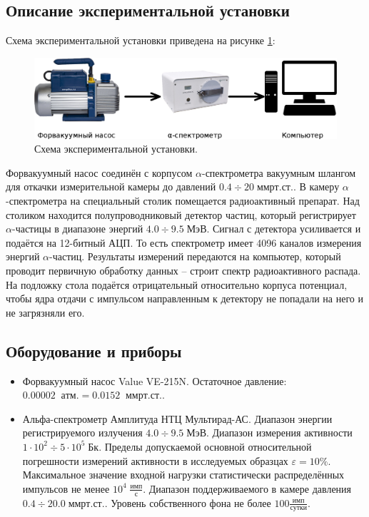 \documentclass[a4paper, 12pt]{article}
\newcommand{\atm}[1][\;]{#1 атм.}
\newcommand{\mmhg}[1][\;]{#1 мм рт.ст.}
\newcommand{\Bk}[1][\;]{#1 Бк}
\newcommand{\MeV}[1][\;]{#1 МэВ}
\begin{document}
    \subsection{Описание экспериментальной установки}	
    
    Схема экспериментальной установки приведена на рисунке \ref{img:exp_scheme}:
        
    \begin{figure}[H]
        \centering
        \includegraphics[width=1\textwidth]{images/exp_scheme.png}
        \caption{Схема экспериментальной установки.}
        \label{img:exp_scheme}
    \end{figure}

    Форвакуумный насос соединён с корпусом $\alpha$-спектрометра вакуумным шлангом для откачки измерительной камеры до давлений $0.4 \div 20 \mmhg$. В камеру $\alpha$-спектрометра на специальный столик помещается радиоактивный препарат. Над столиком находится полупроводниковый детектор частиц, который регистрирует $\alpha$-частицы в диапазоне энергий $4.0 \div 9.5 \MeV$. Сигнал с детектора усиливается и подаётся на 12-битный АЦП. То есть спектрометр имеет 4096 каналов измерения энергий $\alpha$-частиц. Результаты измерений передаются на компьютер, который проводит первичную обработку данных -- строит спектр радиоактивного распада. На подложку стола подаётся отрицательный относительно корпуса потенциал, чтобы ядра отдачи с импульсом направленным к детектору не попадали на него и не загрязняли его.

    \subsection{Оборудование и приборы}
		
    \begin{itemize}
        \item Форвакуумный насос Value VE-215N. Остаточное давление: $0.00002 \; \atm = 0.0152 \;\mmhg$.
		
        \item Альфа-спектрометр Амплитуда НТЦ Мультирад-АС. Диапазон энергии регистрируемого излучения $4.0 \div 9.5 \MeV$. Диапазон измерения активности $1 \cdot 10^2 \div 5 \cdot 10^5 \Bk$. Пределы допускаемой основной относительной погрешности измерений активности в исследуемых образцах $\varepsilon = 10 \%$. Максимальное значение входной нагрузки статистически распределённых импульсов не менее $10^4 \; \frac{имп}{с}$. Диапазон поддерживаемого в камере давления $0.4 \div 20.0 \mmhg$. Уровень собственного фона не более $100 \frac{имп}{сутки}$.
    \end{itemize}
	
\end{document}
